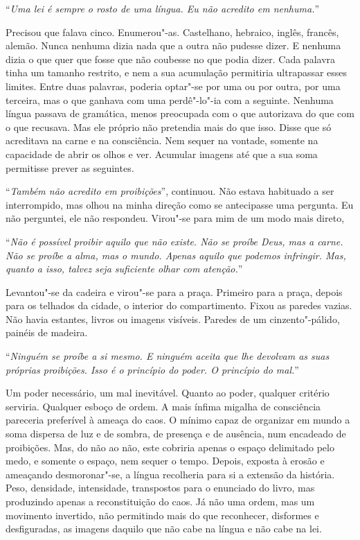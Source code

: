 ``\emph{Uma lei é sempre o rosto de uma língua. Eu não acredito em
nenhuma.}''

Precisou que falava cinco. Enumerou"-as. Castelhano, hebraico, inglês,
francês, alemão. Nunca nenhuma dizia nada que a outra não pudesse dizer.
E nenhuma dizia o que quer que fosse que não coubesse no que podia
dizer. Cada palavra tinha um tamanho restrito, e nem a sua acumulação
permitiria ultrapassar esses limites. Entre duas palavras, poderia
optar"-se por uma ou por outra, por uma terceira, mas o que ganhava com
uma perdê"-lo"-ia com a seguinte. Nenhuma língua passava de gramática,
menos preocupada com o que autorizava do que com o que recusava. Mas ele
próprio não pretendia mais do que isso. Disse que só acreditava na carne
e na consciência. Nem sequer na vontade, somente na capacidade de abrir
os olhos e ver. Acumular imagens até que a sua soma permitisse prever as
seguintes.

``\emph{Também não acredito em proibições}'',
continuou. Não estava habituado a ser interrompido, mas olhou na minha
direção como se antecipasse uma pergunta. Eu não perguntei, ele não
respondeu. Virou"-se para mim de um modo mais direto,

``\emph{Não é possível proibir aquilo que não existe. Não se proíbe Deus,
mas a carne. Não se proíbe a alma, mas o mundo. Apenas aquilo que
podemos infringir. Mas, quanto a isso, talvez seja suficiente olhar com
atenção.}''

Levantou"-se da cadeira e virou"-se para a praça. Primeiro para a praça,
depois para os telhados da cidade, o interior do compartimento. Fixou as
paredes vazias. Não havia estantes, livros ou imagens visíveis. Paredes
de um cinzento"-pálido, painéis de madeira.

``\emph{Ninguém se proíbe a si mesmo. E ninguém aceita que lhe devolvam
as suas próprias proibições. Isso é o princípio do poder. O princípio do
mal.}''

Um poder necessário, um mal inevitável. Quanto ao poder, qualquer
critério serviria. Qualquer esboço de ordem. A mais ínfima migalha de
consciência pareceria preferível à ameaça do caos. O mínimo capaz de
organizar em mundo a soma dispersa de luz e de sombra, de presença e de
ausência, num encadeado de proibições. Mas, do não ao não, este cobriria
apenas o espaço delimitado pelo medo, e somente o espaço, nem sequer o
tempo. Depois, exposta à erosão e ameaçando desmoronar"-se, a língua
recolheria para si a extensão da história. Peso, densidade, intensidade,
transpostos para o enunciado do livro, mas produzindo apenas a
reconstituição do caos. Já não uma ordem, mas um movimento invertido,
não permitindo mais do que reconhecer, disformes e desfiguradas, as
imagens daquilo que não cabe na língua e não cabe na lei.

